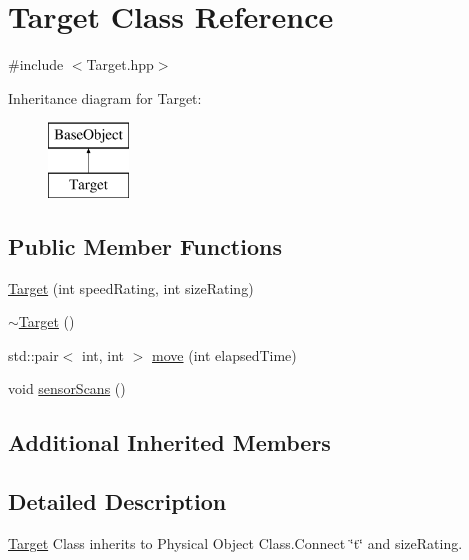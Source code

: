 \hypertarget{classTarget}{\section{Target Class Reference}
\label{classTarget}
}


{\ttfamily \#include $<$Target.\-hpp$>$}

Inheritance diagram for Target\-:\begin{figure}[H]
\begin{center}
\leavevmode
\includegraphics[height=2.000000cm]{classTarget}
\end{center}
\end{figure}
\subsection*{Public Member Functions}
\begin{DoxyCompactItemize}
\item 
\hyperlink{classTarget_a343a7c2b7aa4eb1437c1202a0588e87b}{Target} (int speed\-Rating, int size\-Rating)
\item 
\hyperlink{classTarget_a18102a6c58a268fb1466771463fdc9b3}{$\sim$\-Target} ()
\item 
std\-::pair$<$ int, int $>$ \hyperlink{classTarget_a5a664acae049600db8f53e25f613ac81}{move} (int elapsed\-Time)
\item 
void \hyperlink{classTarget_a0d5f00e2e5587dfc2a4ee89a8bf91b35}{sensor\-Scans} ()
\end{DoxyCompactItemize}
\subsection*{Additional Inherited Members}


\subsection{Detailed Description}
\hyperlink{classTarget}{Target} Class inherits to Physical Object Class.\-Connect \char`\"{}t\char`\"{} and size\-Rating. 

